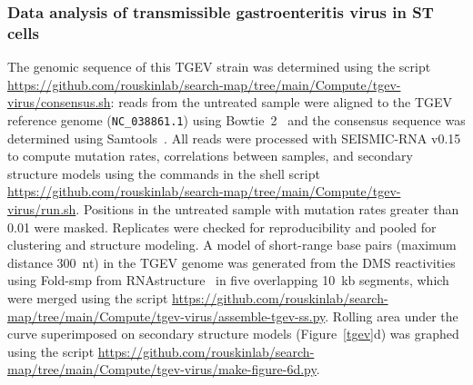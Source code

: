 \documentclass[main.tex]{subfiles}
\begin{document}
\subsubsection{Data analysis of transmissible gastroenteritis virus in ST cells}

The genomic sequence of this TGEV strain was determined using the script \url{https://github.com/rouskinlab/search-map/tree/main/Compute/tgev-virus/consensus.sh}: reads from the untreated sample were aligned to the TGEV reference genome (\verb|NC_038861.1|) using Bowtie~2~\cite{Langmead2012} and the consensus sequence was determined using Samtools~\cite{Li2009}.
All reads were processed with SEISMIC-RNA v0.15 to compute mutation rates, correlations between samples, and secondary structure models using the commands in the shell script \url{https://github.com/rouskinlab/search-map/tree/main/Compute/tgev-virus/run.sh}.
Positions in the untreated sample with mutation rates greater than 0.01 were masked.
Replicates were checked for reproducibility and pooled for clustering and structure modeling.
A model of short-range base pairs (maximum distance 300~nt) in the TGEV genome was generated from the DMS reactivities using Fold-smp from RNAstructure~\cite{Reuter2010} in five overlapping 10~kb segments, which were merged using the script \url{https://github.com/rouskinlab/search-map/tree/main/Compute/tgev-virus/assemble-tgev-ss.py}.
Rolling area under the curve superimposed on secondary structure models (Figure~\ref{tgev}d) was graphed using the script \url{https://github.com/rouskinlab/search-map/tree/main/Compute/tgev-virus/make-figure-6d.py}.
\end{document}
